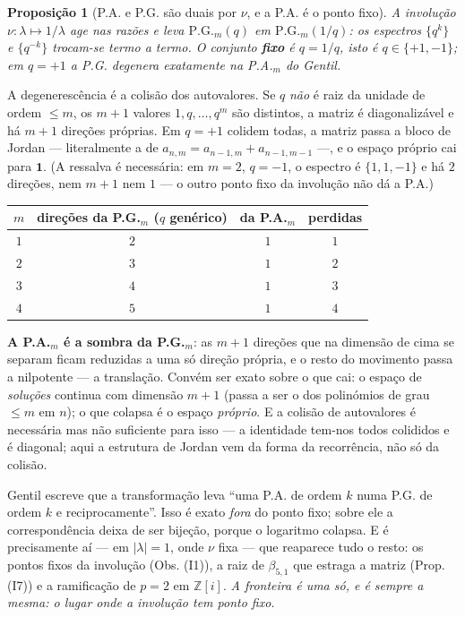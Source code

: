\documentclass[11pt,a4paper]{article}
\theoremstyle{plain}
\newtheorem{proposicao}[teorema]{Proposição}
\theoremstyle{definition}
\theoremstyle{remark}
\newcommand{\Z}{\mathbb{Z}}
\begin{document}
\begin{proposicao}[P.A. e P.G. são duais por $\nu$, e a P.A. é o ponto fixo]\label{prop:papg}
A involução $\nu\colon \lambda\mapsto1/\lambda$ age nas razões e leva
$\mathrm{P.G.}_m(q)$ em $\mathrm{P.G.}_m(1/q)$: os espectros $\{q^k\}$ e $\{q^{-k}\}$ trocam-se
termo a termo. O conjunto \textbf{fixo} é $q = 1/q$, isto é $q\in\{+1,-1\}$; em $q=+1$ a P.G.
degenera exatamente na P.A.$_m$ do Gentil.
\end{proposicao}

\noindent A degenerescência é a colisão dos autovalores. Se $q$ \emph{não} é raiz da unidade de
ordem $\leq m$, os $m+1$ valores $1,q,\dots,q^m$ são distintos, a matriz é diagonalizável e há
$m+1$ direções próprias. Em $q=+1$ colidem todas, a matriz passa a bloco de Jordan --- literalmente
a de $a_{n,m}=a_{n-1,m}+a_{n-1,m-1}$ ---, e o espaço próprio cai para $\mathbf 1$. (A ressalva é
necessária: em $m=2$, $q=-1$, o espectro é $\{1,1,-1\}$ e há $2$ direções, nem $m+1$ nem $1$ --- o
outro ponto fixo da involução não dá a P.A.)

\begin{center}\small
\begin{tabular}{cccc}
\hline
$m$ & direções da P.G.$_m$ ($q$ genérico) & da P.A.$_m$ & perdidas \\ \hline
$1$ & $2$ & $1$ & $1$ \\
$2$ & $3$ & $1$ & $2$ \\
$3$ & $4$ & $1$ & $3$ \\
$4$ & $5$ & $1$ & $4$ \\
\hline
\end{tabular}
\end{center}

\noindent \textbf{A P.A.$_m$ é a sombra da P.G.$_m$}: as $m+1$ direções que na dimensão de cima se
separam ficam reduzidas a uma só direção própria, e o resto do movimento passa a nilpotente --- a
translação. Convém ser exato sobre o que cai: o espaço de \emph{soluções} continua com dimensão
$m+1$ (passa a ser o dos polinómios de grau $\leq m$ em $n$); o que colapsa é o espaço
\emph{próprio}. E a colisão de autovalores é necessária mas não suficiente para isso --- a
identidade tem-nos todos colididos e é diagonal; aqui a estrutura de Jordan vem da forma da
recorrência, não só da colisão.

Gentil escreve que a transformação leva ``uma P.A. de ordem $k$ numa P.G. de ordem $k$ e
reciprocamente''. Isso é exato \emph{fora} do ponto fixo; sobre ele a correspondência deixa de ser
bijeção, porque o logaritmo colapsa. E é precisamente aí --- em $|\lambda|=1$, onde $\nu$ fixa ---
que reaparece tudo o resto: os pontos fixos da involução (Obs. (I1)), a raiz de
$\beta_{5,1}$ que estraga a matriz (Prop. (I7)) e a ramificação de $p=2$ em $\Z[i]$.
\emph{A fronteira é uma só, e é sempre a mesma: o lugar onde a involução tem ponto fixo.}
\end{document}
